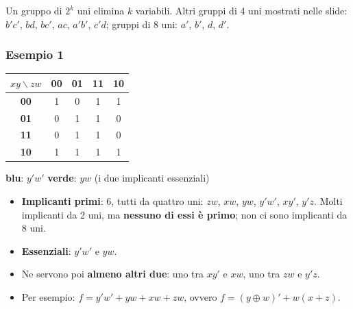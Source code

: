 \documentclass[12pt, a4paper]{article}
\begin{document}
Un gruppo di $2^k$ uni elimina $k$ variabili. Altri gruppi di 4 uni mostrati nelle slide: $b'c'$, $bd$, $bc'$, $ac$, $a'b'$, $c'd$; gruppi di 8 uni: $a'$, $b'$, $d$, $d'$.

\subsubsection{Esempio 1}
\begin{center}
\renewcommand{\arraystretch}{1.25}
\begin{tabular}[t]{|c|c|c|c|c|}
\hline
\colorbox{gray!25}{\color{black}$xy\backslash zw$} & \colorbox{gray!25}{\color{black}\textbf{00}} & \colorbox{gray!25}{\color{black}\textbf{01}} & \colorbox{gray!25}{\color{black}\textbf{11}} & \colorbox{gray!25}{\color{black}\textbf{10}} \\ \hline
\colorbox{gray!25}{\color{black}\textbf{00}} & \colorbox{blue!25}{\color{black}1} & 0 & 1 & \colorbox{blue!25}{\color{black}1} \\ \hline
\colorbox{gray!25}{\color{black}\textbf{01}} & 0 & \colorbox{green!30}{\color{black}1} & \colorbox{green!30}{\color{black}1} & 0 \\ \hline
\colorbox{gray!25}{\color{black}\textbf{11}} & 0 & \colorbox{green!30}{\color{black}1} & \colorbox{green!30}{\color{black}1} & 0 \\ \hline
\colorbox{gray!25}{\color{black}\textbf{10}} & \colorbox{blue!25}{\color{black}1} & 1 & 1 & \colorbox{blue!25}{\color{black}1} \\ \hline
\end{tabular}
\end{center}
\begin{center}
\textcolor{blue!70!black}{\textbf{blu}}: $y'w'$ \qquad \textcolor{green!50!black}{\textbf{verde}}: $yw$ (i due implicanti essenziali)
\end{center}
\begin{itemize}
    \item \textbf{Implicanti primi}: 6, tutti da quattro uni: $zw$, $xw$, $yw$, $y'w'$, $xy'$, $y'z$. Molti implicanti da 2 uni, ma \textbf{nessuno di essi è primo}; non ci sono implicanti da 8 uni.
    \item \textbf{Essenziali}: $y'w'$ e $yw$.
    \item Ne servono poi \textbf{almeno altri due}: uno tra $xy'$ e $xw$, uno tra $zw$ e $y'z$.
    \item Per esempio: $f = y'w' + yw + xw + zw$, ovvero $f = (y \oplus w)' + w(x + z)$.
\end{itemize}
\end{document}
